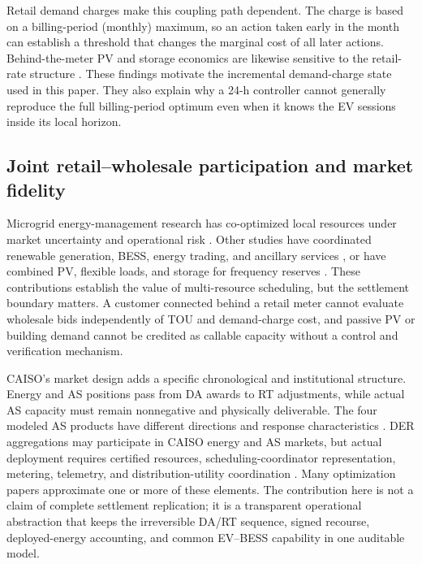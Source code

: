 \documentclass[final,5p,times]{elsarticle}
\begin{document}
Retail demand charges make this coupling path dependent. The charge is based on a billing-period (monthly) maximum, so an action taken early in the month can establish a threshold that changes the marginal cost of all later actions. Behind-the-meter PV and storage economics are likewise sensitive to the retail-rate structure \cite{boampong2020retail}. These findings motivate the incremental demand-charge state used in this paper. They also explain why a 24-h controller cannot generally reproduce the full billing-period optimum even when it knows the EV sessions inside its local horizon.

\subsection{Joint retail--wholesale participation and market fidelity}
Microgrid energy-management research has co-optimized local resources under market uncertainty and operational risk \cite{parisio2014model,shen2016microgrid,hasankhani2021stochastic}. Other studies have coordinated renewable generation, BESS, energy trading, and ancillary services \cite{santosuosso2024sempc}, or have combined PV, flexible loads, and storage for frequency reserves \cite{warmerdam2026power}. These contributions establish the value of multi-resource scheduling, but the settlement boundary matters. A customer connected behind a retail meter cannot evaluate wholesale bids independently of TOU and demand-charge cost, and passive PV or building demand cannot be credited as callable capacity without a control and verification mechanism.

CAISO's market design adds a specific chronological and institutional structure. Energy and AS positions pass from DA awards to RT adjustments, while actual AS capacity must remain nonnegative and physically deliverable. The four modeled AS products have different directions and response characteristics \cite{caisoAncillary2026}. DER aggregations may participate in CAISO energy and AS markets, but actual deployment requires certified resources, scheduling-coordinator representation, metering, telemetry, and distribution-utility coordination \cite{caisoDER2026}. Many optimization papers approximate one or more of these elements. The contribution here is not a claim of complete settlement replication; it is a transparent operational abstraction that keeps the irreversible DA/RT sequence, signed recourse, deployed-energy accounting, and common EV--BESS capability in one auditable model.
\end{document}
